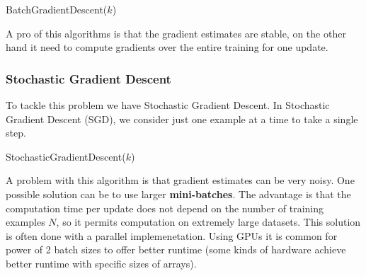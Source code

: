 \begin{algorithm}
    \caption{BatchGradientDescent($k$)}
    \label{alg:batch_gradient_descent}

    
\end{algorithm}

A pro of this algorithms is that the gradient estimates are stable, on the other hand it need to compute gradients over the entire training for one update.

\subsubsection{Stochastic Gradient Descent}
To tackle this problem we have Stochastic Gradient Descent. In Stochastic Gradient Descent (SGD), we consider just one example at a time to take a single step.

\begin{algorithm}
    \caption{StochasticGradientDescent($k$)}
    \label{alg:stochastic_gradient_descent}

    
\end{algorithm}

A problem with this algorithm is that gradient estimates can be very noisy. One possible solution can be to use larger \textbf{mini-batches}. The advantage is that the computation time per update does not depend on the number of training examples \(N\), so it permits computation on extremely large datasets. This solution is often done with a parallel implemenetation. Using GPUs it is common for power of 2 batch sizes to offer better runtime (some kinds of hardware achieve better runtime with specific sizes of arrays).

